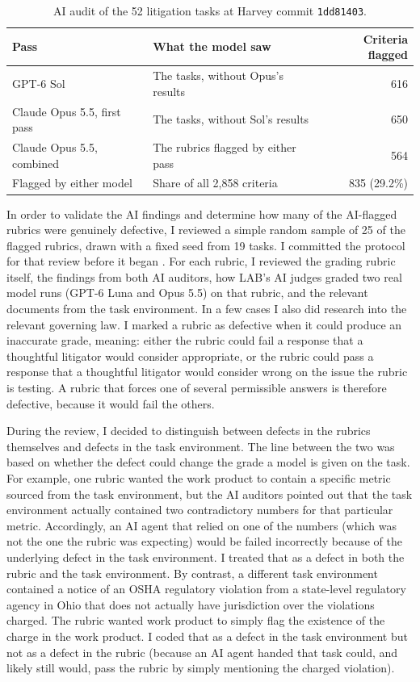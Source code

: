 \documentclass[11pt]{article}
\newcommand{\labTasks}{52}
\newcommand{\labCriteria}{2{,}858}
\newcommand{\labSolFlagged}{616}
\newcommand{\labOpusBlind}{650}
\newcommand{\labOpusFinal}{564}
\newcommand{\labFlagged}{835}
\newcommand{\labFlaggedPct}{29.2}
\newcommand{\labSample}{25}
\newcommand{\labSampleTasks}{19}
\begin{document}
\begin{table}[ht]\centering\small
\begin{tabular}{llr}\toprule
Pass & What the model saw & Criteria flagged\\\midrule
GPT-6 Sol & The tasks, without Opus's results & \labSolFlagged{}\\
Claude Opus 5.5, first pass & The tasks, without Sol's results & \labOpusBlind{}\\
Claude Opus 5.5, combined & The rubrics flagged by either pass & \labOpusFinal{}\\\midrule
Flagged by either model & Share of all \labCriteria{} criteria & \labFlagged{} (\labFlaggedPct\%)\\
\bottomrule\end{tabular}
\caption{AI audit of the \labTasks{} litigation tasks at Harvey commit \texttt{1dd81403}.}
\label{tab:labaudit}\end{table}

In order to validate the AI findings and determine how many of the AI-flagged rubrics were genuinely defective, I reviewed a simple random sample of \labSample{} of the flagged rubrics, drawn with a fixed seed from \labSampleTasks{} tasks. I committed the protocol for that review before it began \citep{labreview}. For each rubric, I reviewed the grading rubric itself, the findings from both AI auditors, how LAB's AI judges graded two real model runs (GPT-6 Luna and Opus 5.5) on that rubric, and the relevant documents from the task environment. In a few cases I also did research into the relevant governing law. I marked a rubric as defective when it could produce an inaccurate grade, meaning: either the rubric could fail a response that a thoughtful litigator would consider appropriate, or the rubric could pass a response that a thoughtful litigator would consider wrong on the issue the rubric is testing. A rubric that forces one of several permissible answers is therefore defective, because it would fail the others.

During the review, I decided to distinguish between defects in the rubrics themselves and defects in the task environment. The line between the two was based on whether the defect could change the grade a model is given on the task. For example, one rubric wanted the work product to contain a specific metric sourced from the task environment, but the AI auditors pointed out that the task environment actually contained two contradictory numbers for that particular metric. Accordingly, an AI agent that relied on one of the numbers (which was not the one the rubric was expecting) would be failed incorrectly because of the underlying defect in the task environment. I treated that as a defect in both the rubric and the task environment. By contrast, a different task environment contained a notice of an OSHA regulatory violation from a state-level regulatory agency in Ohio that does not actually have jurisdiction over the violations charged. The rubric wanted work product to simply flag the existence of the charge in the work product. I coded that as a defect in the task environment but not as a defect in the rubric (because an AI agent handed that task could, and likely still would, pass the rubric by simply mentioning the charged violation).
\end{document}

